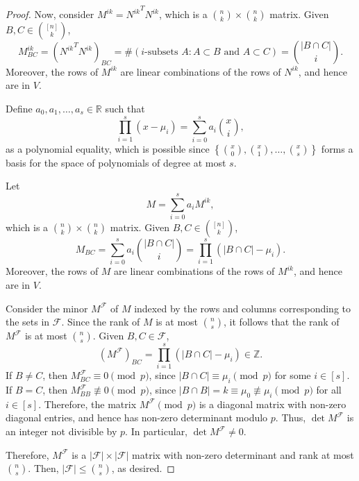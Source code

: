 \begin{proof}
    Now, consider \(M^{ik} = {N^{ik}}^T N^{ik}\),
    which is a \(\binom{n}{k} \times \binom{n}{k}\) matrix.
    Given \(B, C \in \binom{[n]}{k}\),
    \begin{equation}
        M^{ik}_{BC} = 
        ({N^{ik}}^T N^{ik})_{BC} =
        \#
        \left(
            \text{\(i\)-subsets } A : A \subset B \text{ and } A \subset C
        \right)
        =
        \binom{|B \cap C|}{i}.
    \end{equation}
    Moreover, the rows of \(M^{ik}\) are linear combinations of the rows of \(N^{ik}\), and hence are in \(V\).

    Define \(a_0, a_1, \dots, a_s \in \mathbb{R}\) such that
    \begin{equation}
        \prod_{i=1}^{s} (x - \mu_i) = \sum_{i=0}^{s} a_i \binom{x}{i},
    \end{equation}
    as a polynomial equality, which is possible since
    \(
        \left\{\binom{x}{0}, \binom{x}{1}, \dots, \binom{x}{s}\right\}
    \)
    forms a basis for the space of polynomials of degree at most \(s\).

    Let
    \begin{equation}
        M = \sum_{i=0}^{s} a_i M^{i k},
    \end{equation}
    which is a \(\binom{n}{k} \times \binom{n}{k}\) matrix.
    Given \(B, C \in \binom{[n]}{k}\),
    \begin{equation}
        M_{BC} = \sum_{i=0}^{s} a_i \binom{|B \cap C|}{i} = \prod_{i=1}^{s} (|B \cap C| - \mu_i).
    \end{equation}
    Moreover, the rows of \(M\) are linear combinations of the rows of \(M^{ik}\), and hence are in \(V\).

    Consider the minor \(M^{\mathcal{F}}\) of \(M\)
    indexed by the rows and columns corresponding to the sets in \(\mathcal{F}\).
    Since the rank of \(M\) is at most \(\binom{n}{s}\),
    it follows that the rank of \(M^{\mathcal{F}}\) is at most \(\binom{n}{s}\).
    Given \(B, C \in \mathcal{F}\),
    \begin{equation}
        (M^{\mathcal{F}})_{BC} = \prod_{i=1}^{s} (|B \cap C| - \mu_i) \in \mathbb{Z}.
    \end{equation}
    If \(B \neq C\), then \(M^{\mathcal{F}}_{BC} \equiv 0 \pmod{p}\),
    since \(|B \cap C| \equiv \mu_i \pmod{p}\) for some \(i \in [s]\).
    If \(B = C\), then \(M^{\mathcal{F}}_{BB} \not\equiv 0 \pmod{p}\),
    since \(|B \cap B| = k \equiv \mu_0 \not\equiv \mu_i \pmod{p}\) for all \(i \in [s]\).
    Therefore,
    the matrix \(M^{\mathcal{F}} \pmod{p}\) is a diagonal matrix with non-zero diagonal entries, and hence has non-zero determinant modulo \(p\).
    Thus, \(\det M^{\mathcal{F}}\) is an integer not divisible by \(p\).
    In particular, \(\det M^{\mathcal{F}} \neq 0\).

    Therefore, \(M^{\mathcal{F}}\) is a \(|\mathcal{F}| \times |\mathcal{F}|\) matrix with non-zero determinant and rank at most \(\binom{n}{s}\).
    Then, \(|\mathcal{F}| \leq \binom{n}{s}\), as desired.
\end{proof}

